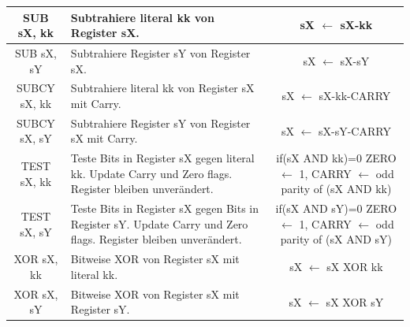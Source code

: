\documentclass{scrartcl}
\begin{document}
\begin{longtable}{||c|p{4cm}|c||}
         SUB sX, kk & Subtrahiere literal kk von Register sX. &sX $\leftarrow$ sX-kk  \\ \hline
         SUB sX, sY & Subtrahiere Register sY von Register sX. &sX $\leftarrow$ sX-sY  \\ \hline
         SUBCY sX, kk & Subtrahiere literal kk von Register sX mit Carry. &sX $\leftarrow$ sX-kk-CARRY  \\ \hline
         SUBCY sX, sY & Subtrahiere Register sY von Register sX mit Carry. &sX $\leftarrow$ sX-sY-CARRY  \\ \hline
         TEST sX, kk & Teste Bits in Register sX gegen literal kk. Update Carry und Zero flags. Register bleiben unverändert. & \makecell{if(sX AND kk)=0 ZERO $\leftarrow$ 1, \\ CARRY $\leftarrow$ odd parity of (sX AND kk) }   \\ \hline
         TEST sX, sY  & Teste Bits in Register sX gegen Bits in Register sY. Update Carry und Zero flags. Register bleiben unverändert. & \makecell{if(sX AND sY)=0 ZERO $\leftarrow$ 1, \\ CARRY $\leftarrow$ odd parity of (sX AND sY) }  \\ \hline
         XOR sX, kk & Bitweise XOR von Register sX mit literal kk. &sX $\leftarrow$ sX XOR kk  \\ \hline
         XOR sX, sY & Bitweise XOR von Register sX mit Register sY. &sX $\leftarrow$ sX XOR sY   \\ \hline
         
    \end{longtable}
\end{document}
